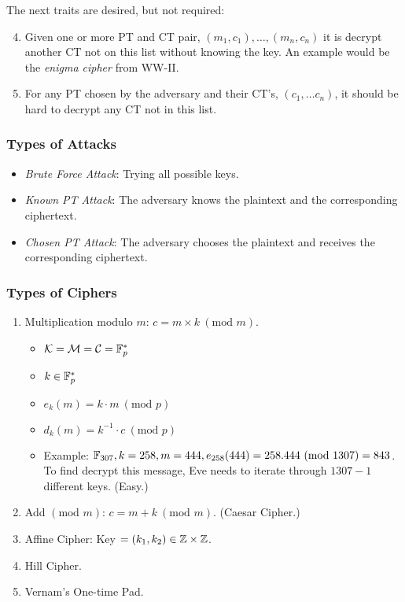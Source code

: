 The next traits are desired, but not required:

\begin{enumerate}[label=\arabic*.]
    \setcounter{enumi}{3}
    \item Given one or more PT and CT pair, \((m_1,c_1),\dots,(m_n,c_n)\) it is decrypt another CT not on this list without knowing the key. An example would be the \textit{enigma cipher} from WW-II\@.
    \item For any PT chosen by the adversary and their CT's, \((c_1,\dots c_n)\), it should be hard to decrypt any CT not in this list.
\end{enumerate}

\begin{center}
    \subsubsection{Types of Attacks}
\end{center}

\begin{itemize}
    \item \textit{Brute Force Attack}: Trying all possible keys.
    \item \textit{Known PT Attack}: The adversary knows the plaintext and the corresponding ciphertext.
    \item \textit{Chosen PT Attack}: The adversary chooses the plaintext and receives the corresponding ciphertext.
\end{itemize}

\begin{center}
    \subsubsection{Types of Ciphers}
\end{center}

\begin{enumerate}[label=\arabic*.]
    \item Multiplication modulo \(m\): \(c = m \times k \ (\text{mod } m)\).
          \begin{itemize}
              \item \(\mathcal{K} = \mathcal{M} = \mathcal{C} = \mathbb{F}_p^*\)
              \item \(k \in \mathbb{F}_p^*\)
              \item \(e_k(m) = k \cdot m \ (\text{mod } p)\)
              \item \(d_k(m) = k^{-1} \cdot c \ (\text{mod } p)\)
              \item Example: \(\mathbb{F}_{307}, k = 258, m = 444, e_{258}(444) = 258.444 \ (\text{mod } 1307) = 843\). To find decrypt this message, Eve needs to iterate through \(1307 - 1\) different keys. (Easy.)
          \end{itemize}
    \item Add \((\text{mod } m)\): \(c = m + k \ (\text{mod } m)\). (Caesar Cipher.)
    \item Affine Cipher: Key \(= (k_1,k_2) \in \mathbb{Z} \times \mathbb{Z}\).
    \item Hill Cipher.
    \item Vernam's One-time Pad.
\end{enumerate}

